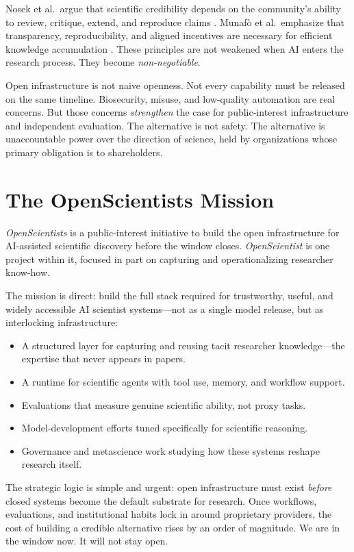 \documentclass[11pt]{article}
\begin{document}
Nosek et al.\ argue that scientific credibility depends on the community's ability to review, critique, extend, and reproduce claims \citep{nosek2015openresearch}. Munaf\`{o} et al.\ emphasize that transparency, reproducibility, and aligned incentives are necessary for efficient knowledge accumulation \citep{munafo2017manifesto}. These principles are not weakened when AI enters the research process. They become \emph{non-negotiable}.

Open infrastructure is not naive openness. Not every capability must be released on the same timeline. Biosecurity, misuse, and low-quality automation are real concerns. But those concerns \emph{strengthen} the case for public-interest infrastructure and independent evaluation. The alternative is not safety. The alternative is unaccountable power over the direction of science, held by organizations whose primary obligation is to shareholders.

\section{The OpenScientists Mission}

\emph{OpenScientists} is a public-interest initiative to build the open infrastructure for AI-assisted scientific discovery before the window closes. \emph{OpenScientist} is one project within it, focused in part on capturing and operationalizing researcher know-how.

The mission is direct: build the full stack required for trustworthy, useful, and widely accessible AI scientist systems---not as a single model release, but as interlocking infrastructure:

\begin{itemize}
  \item A structured layer for capturing and reusing tacit researcher knowledge---the expertise that never appears in papers.
  \item A runtime for scientific agents with tool use, memory, and workflow support.
  \item Evaluations that measure genuine scientific ability, not proxy tasks.
  \item Model-development efforts tuned specifically for scientific reasoning.
  \item Governance and metascience work studying how these systems reshape research itself.
\end{itemize}

The strategic logic is simple and urgent: open infrastructure must exist \emph{before} closed systems become the default substrate for research. Once workflows, evaluations, and institutional habits lock in around proprietary providers, the cost of building a credible alternative rises by an order of magnitude. We are in the window now. It will not stay open.
\end{document}
